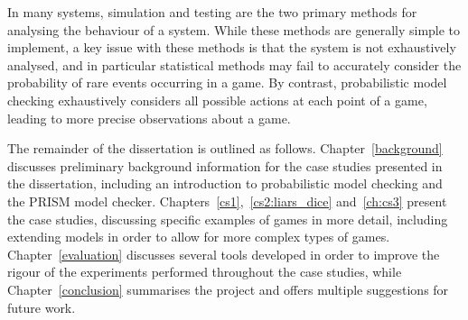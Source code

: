 In many systems, simulation and testing are the two primary methods for analysing the behaviour of a system. While these methods are generally simple to implement, a key issue with these methods is that the system is not exhaustively analysed, and in particular statistical methods may fail to accurately consider the probability of rare events occurring in a game. By contrast, probabilistic model checking exhaustively considers all possible actions at each point of a game, leading to more precise observations about a game.

The remainder of the dissertation is outlined as follows. Chapter~\ref{background} discusses preliminary background information for the case studies presented in the dissertation, including an introduction to probabilistic model checking and the PRISM model checker. Chapters~\ref{cs1},~\ref{cs2:liars_dice} and~\ref{ch:cs3} present the case studies, discussing specific examples of games in more detail, including extending models in order to allow for more complex types of games. Chapter~\ref{evaluation} discusses several tools developed in order to improve the rigour of the experiments performed throughout the case studies, while Chapter~\ref{conclusion} summarises the project and offers multiple suggestions for future work.